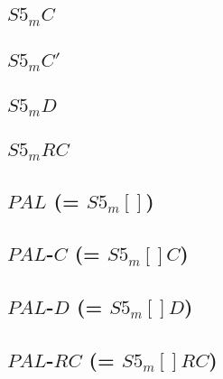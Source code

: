\documentclass[11pt]{article}
\begin{document}
\subsection{$S5_mC$}
\subsection{$S5_mC'$}
\subsection{$S5_mD$}
\subsection{$S5_mRC$}

\subsection{$PAL$ (= $S5_m[]$)}
\subsection{$PAL$-$C$ (= $S5_m[]C$)}
\subsection{$PAL$-$D$ (= $S5_m[]D$)}
\subsection{$PAL$-$RC$ (= $S5_m[]RC$)}
\end{document}
